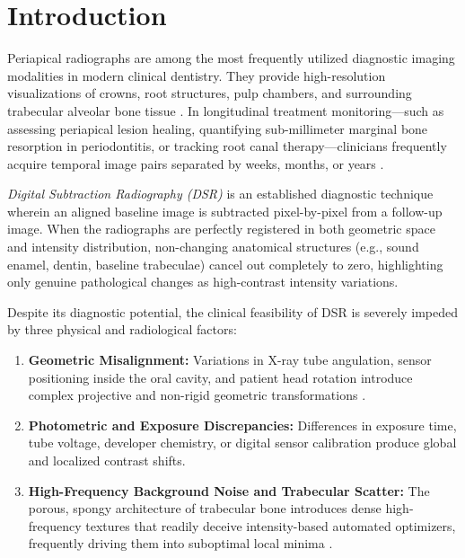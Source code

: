 \documentclass[11pt,a4paper]{article}
\begin{document}
\vspace{0.4cm}
\tableofcontents
\newpage

\section{Introduction}
\label{sec:intro}

Periapical radiographs are among the most frequently utilized diagnostic imaging modalities in modern clinical dentistry. They provide high-resolution visualizations of crowns, root structures, pulp chambers, and surrounding trabecular alveolar bone tissue \cite{lehmann2000subtraction}. In longitudinal treatment monitoring—such as assessing periapical lesion healing, quantifying sub-millimeter marginal bone resorption in periodontitis, or tracking root canal therapy—clinicians frequently acquire temporal image pairs separated by weeks, months, or years \cite{zitova2003image, maintz1998survey}.

\textit{Digital Subtraction Radiography (DSR)} is an established diagnostic technique wherein an aligned baseline image is subtracted pixel-by-pixel from a follow-up image. When the radiographs are perfectly registered in both geometric space and intensity distribution, non-changing anatomical structures (e.g., sound enamel, dentin, baseline trabeculae) cancel out completely to zero, highlighting only genuine pathological changes as high-contrast intensity variations.

Despite its diagnostic potential, the clinical feasibility of DSR is severely impeded by three physical and radiological factors:
\begin{enumerate}
    \item \textbf{Geometric Misalignment:} Variations in X-ray tube angulation, sensor positioning inside the oral cavity, and patient head rotation introduce complex projective and non-rigid geometric transformations \cite{ostuni1997review, goshtasby1988image}.
    \item \textbf{Photometric and Exposure Discrepancies:} Differences in exposure time, tube voltage, developer chemistry, or digital sensor calibration produce global and localized contrast shifts.
    \item \textbf{High-Frequency Background Noise and Trabecular Scatter:} The porous, spongy architecture of trabecular bone introduces dense high-frequency textures that readily deceive intensity-based automated optimizers, frequently driving them into suboptimal local minima \cite{balakrishnan2019voxelmorph}.
\end{enumerate}
\end{document}
